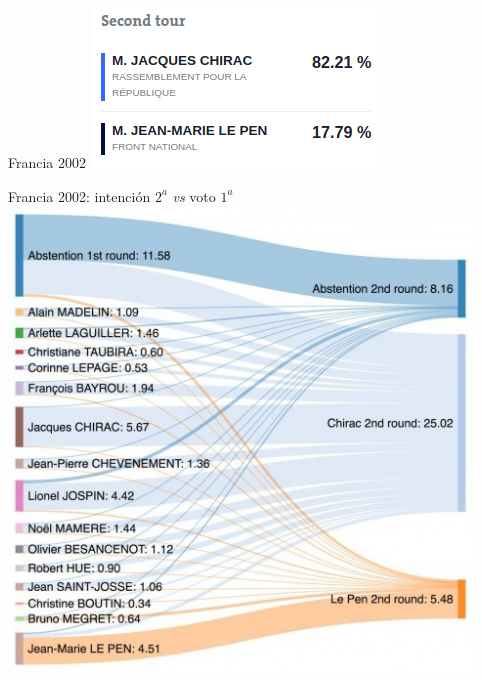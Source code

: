 \documentclass[bigger]{beamer}
\begin{document}
\begin{frame}[label={sec:org158fa54}]{Francia 2002}
\pause \centering
\includegraphics[width=.33\textwidth]{./pics/f4.png}
\end{frame}
\begin{frame}[label={sec:org576ef01}]{Francia 2002: intención \(2^a\) \emph{vs} voto \(1^a\)}
\centering   
\includegraphics[width=.7\textwidth]{./pics/f1-2.png}
\end{frame}
\end{document}
